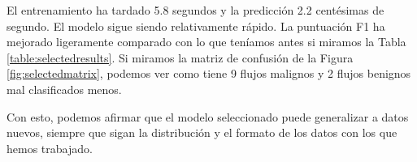 El entrenamiento ha tardado 5.8 segundos y la predicción 2.2 centésimas de segundo. El modelo sigue siendo relativamente rápido. La puntuación F1 ha mejorado ligeramente comparado con lo que teníamos antes si miramos la Tabla \ref{table:selectedresults}. Si miramos la matriz de confusión de la Figura \ref{fig:selectedmatrix}, podemos ver como tiene 9 flujos malignos y 2 flujos benignos mal clasificados menos. 

Con esto, podemos afirmar que el modelo seleccionado puede generalizar a datos nuevos, siempre que sigan la distribución y el formato de los datos con los que hemos trabajado. 

